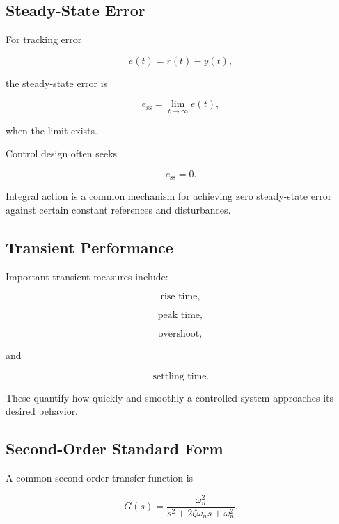 \subsection{Steady-State Error}
\label{subsec:steady-state-error}

For tracking error

\[
e(t)=r(t)-y(t),
\]

the steady-state error is

\[
\boxed{
e_{\mathrm{ss}}
=
\lim_{t\to\infty}e(t),
}
\]

when the limit exists.

Control design often seeks

\[
\boxed{
e_{\mathrm{ss}}=0.
}
\]

Integral action is a common mechanism for achieving zero steady-state error
against certain constant references and disturbances.

\subsection{Transient Performance}
\label{subsec:control-transient-performance}

Important transient measures include:

\[
\boxed{
\text{rise time},
}
\]

\[
\boxed{
\text{peak time},
}
\]

\[
\boxed{
\text{overshoot},
}
\]

and

\[
\boxed{
\text{settling time}.
}
\]

These quantify how quickly and smoothly a controlled system approaches its
desired behavior.

\subsection{Second-Order Standard Form}
\label{subsec:second-order-control-standard-form}

A common second-order transfer function is

\[
\boxed{
G(s)
=
\frac{\omega_n^2}
{s^2+2\zeta\omega_ns+\omega_n^2}.
}
\]

